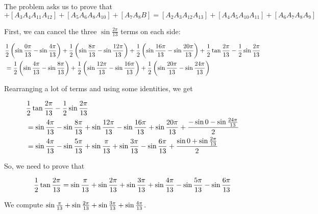 \documentclass[10pt]{../usamts}
\begin{document}
\begin{solution}
The problem asks us to prove that
\begin{equation}
[A_1A_2A_3] + [A_3A_4A_{11}A_{12}] + [A_5A_6A_{8}A_{10}] + [A_7A_8B] = [A_2A_3A_{12}A_{13}] + [A_4A_5A_{10}A_{11}]+ [A_6A_7A_{8}A_{9}]
\end{equation}

First, we can cancel the three $\sin\frac{2\pi}{13}$ terms on each side:

\newcommand{\showsinsubtraction}[2] {
    \frac{1}{2}\paren{\sinthirteen{#1} - \sinthirteen{#2}}
}

\begin{align*}
    &\showsinsubtraction{0}{4} +
    \showsinsubtraction{8}{12} +
    \showsinsubtraction{16}{20} +
    \showtrianglebarea \\
    &=
    \showsinsubtraction{4}{8} +
    \showsinsubtraction{12}{16} +
    \showsinsubtraction{20}{24}
\end{align*}

Rearranging a lot of terms and using some identities, we get

\begin{align*}
    &\frac{1}{2} \tan{\frac{2\pi}{13}} - \frac{1}{2} \sin{\frac{2\pi}{13}} \\
    &= \sin{{\frac{4\pi}{13}}} - \sin{{\frac{8\pi}{13}}} + \sin{{\frac{12\pi}{13}}} - \sin{{\frac{16\pi}{13}}}
    + \sin{{\frac{20\pi}{13}}} + \frac{-\sin0 - \sin{{\frac{24\pi}{13}}}}{2} \\
    &= \sin{{\frac{4\pi}{13}}} - \sin{{\frac{5\pi}{13}}} + \sin{{\frac{\pi}{13}}} + \sin{{\frac{3\pi}{13}}}
    - \sin{{\frac{6\pi}{13}}} + \frac{\sin0 + \sin{{\frac{2\pi}{13}}}}{2}
\end{align*}

So, we need to prove that

\begin{equation}
    \frac{1}{2} \tan{{\frac{2\pi}{13}}}
    = \sin{{\frac{\pi}{13}}} + \sin{{\frac{2\pi}{13}}} + \sin{{\frac{3\pi}{13}}} + \sin{{\frac{4\pi}{13}}} - \sin{{\frac{5\pi}{13}}} - \sin{{\frac{6\pi}{13}}}
\end{equation}

We compute $\sin{{\frac{\pi}{13}}} + \sin{{\frac{2\pi}{13}}} + \sin{{\frac{3\pi}{13}}} + \sin{{\frac{4\pi}{13}}}$.


\end{solution}
\end{document}
